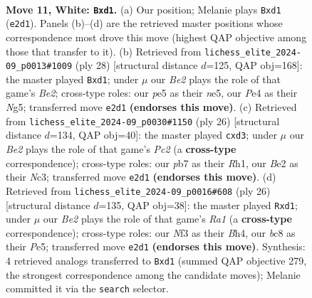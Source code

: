 \documentclass[11pt]{article}
\begin{document}
\clearpage

\begin{figure}[p]\centering
\begin{subfigure}{0.46\textwidth}\centering
\resizebox{\linewidth}{!}{%
\newchessgame
\chessboard[
  setfen={rnb2rk1/ppp3bp/5pp1/4p3/2P1P1P1/2N2N2/PP2BPP1/1RBqK2R w K - 0 11},
  showmover=false,
  pgfstyle=straightmove, color=movearrow, markmove={e2-d1}
]}
\caption{}
\end{subfigure}\hfill
\begin{subfigure}{0.46\textwidth}\centering
\resizebox{\linewidth}{!}{%
\newchessgame
\chessboard[
  setfen={rnb1r1k1/pp4bp/4P1p1/2p1n1N1/8/2N5/PP2B1PP/R1BqK2R w KQ - 0 15},
  showmover=false,
  pgfstyle=straightmove, color=movearrow, markmove={e2-d1}
]}
\caption{}
\end{subfigure}
\\[4pt]
\begin{subfigure}{0.46\textwidth}\centering
\resizebox{\linewidth}{!}{%
\newchessgame
\chessboard[
  setfen={r3k2r/pp2bpp1/2bppn1p/8/3NP2P/2Nq4/PPPB1PP1/2KR3R w kq - 0 14},
  showmover=false,
  pgfstyle=straightmove, color=movearrow, markmove={c2-d3}
]}
\caption{}
\end{subfigure}\hfill
\begin{subfigure}{0.46\textwidth}\centering
\resizebox{\linewidth}{!}{%
\newchessgame
\chessboard[
  setfen={rn3rk1/pbp1npp1/1p2p2p/4P3/2P4B/P1N2P2/1P3KPP/R2q1B1R w - - 0 14},
  showmover=false,
  pgfstyle=straightmove, color=movearrow, markmove={a1-d1}
]}
\caption{}
\end{subfigure}
\caption{\textbf{Move 11, White: \texttt{Bxd1}.} (a) Our position; Melanie plays \texttt{Bxd1} (\texttt{e2d1}). Panels (b)--(d) are the retrieved master positions whose correspondence most drove this move (highest QAP objective among those that transfer to it). (b) Retrieved from \texttt{lichess\_elite\_2024-09\_p0013\#1009} (ply 28) [structural distance $d$=125, QAP obj=168]: the master played \texttt{Bxd1}; under $\mu$ our \emph{Be2} plays the role of that game's \emph{Be2}; cross-type roles: our \emph{p}e5 as their \emph{n}e5, our \emph{P}e4 as their \emph{N}g5; transferred move \texttt{e2d1} \textbf{(endorses this move)}. (c) Retrieved from \texttt{lichess\_elite\_2024-09\_p0030\#1150} (ply 26) [structural distance $d$=134, QAP obj=40]: the master played \texttt{cxd3}; under $\mu$ our \emph{Be2} plays the role of that game's \emph{Pc2} (a \textbf{cross-type} correspondence); cross-type roles: our \emph{p}b7 as their \emph{R}h1, our \emph{B}e2 as their \emph{N}c3; transferred move \texttt{e2d1} \textbf{(endorses this move)}. (d) Retrieved from \texttt{lichess\_elite\_2024-09\_p0016\#608} (ply 26) [structural distance $d$=135, QAP obj=38]: the master played \texttt{Rxd1}; under $\mu$ our \emph{Be2} plays the role of that game's \emph{Ra1} (a \textbf{cross-type} correspondence); cross-type roles: our \emph{N}f3 as their \emph{B}h4, our \emph{b}c8 as their \emph{P}e5; transferred move \texttt{e2d1} \textbf{(endorses this move)}. Synthesis: 4 retrieved analogs transferred to \texttt{Bxd1} (summed QAP objective 279, the strongest correspondence among the candidate moves); Melanie committed it via the \texttt{search} selector.}

\end{figure}
\end{document}
